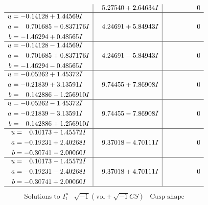 \documentclass[1p]{elsarticle_modified}
\theoremstyle{definition}
\newcommand{\I}{\sqrt{-1}}
\begin{document}
$$\begin{array}{c|c|c}
 & \phantom{-}5.27540 + 2.64634 I & \phantom{-0.000000 } 0 \\ \hline\begin{aligned}
u &= -0.14128 + 1.44569 I \\
a &= \phantom{-}0.701685 - 0.837176 I \\
b &= -1.46294 + 0.48565 I\end{aligned}
 & \phantom{-}4.24691 + 5.84943 I & \phantom{-0.000000 } 0 \\ \hline\begin{aligned}
u &= -0.14128 - 1.44569 I \\
a &= \phantom{-}0.701685 + 0.837176 I \\
b &= -1.46294 - 0.48565 I\end{aligned}
 & \phantom{-}4.24691 - 5.84943 I & \phantom{-0.000000 } 0 \\ \hline\begin{aligned}
u &= -0.05262 + 1.45372 I \\
a &= -0.21839 + 3.13591 I \\
b &= \phantom{-}0.142886 - 1.256910 I\end{aligned}
 & \phantom{-}9.74455 + 7.86908 I & \phantom{-0.000000 } 0 \\ \hline\begin{aligned}
u &= -0.05262 - 1.45372 I \\
a &= -0.21839 - 3.13591 I \\
b &= \phantom{-}0.142886 + 1.256910 I\end{aligned}
 & \phantom{-}9.74455 - 7.86908 I & \phantom{-0.000000 } 0 \\ \hline\begin{aligned}
u &= \phantom{-}0.10173 + 1.45572 I \\
a &= -0.19231 + 2.40268 I \\
b &= -0.30741 - 2.00060 I\end{aligned}
 & \phantom{-}9.37018 - 4.70111 I & \phantom{-0.000000 } 0 \\ \hline\begin{aligned}
u &= \phantom{-}0.10173 - 1.45572 I \\
a &= -0.19231 - 2.40268 I \\
b &= -0.30741 + 2.00060 I\end{aligned}
 & \phantom{-}9.37018 + 4.70111 I & \phantom{-0.000000 } 0\\
 \hline 
 \end{array}$$\newpage$$\begin{array}{c|c|c}  
\text{Solutions to }I^u_{1}& \I (\text{vol} + \sqrt{-1}CS) & \text{Cusp shape}\\

\end{array}$$
\end{document}
